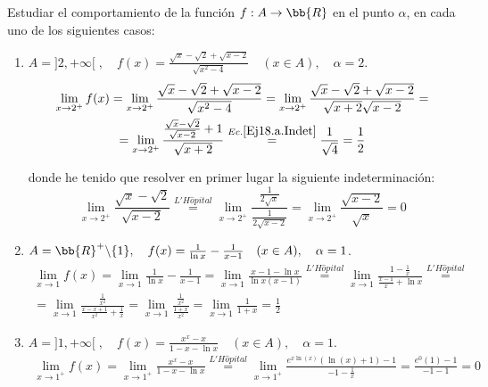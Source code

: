 \begin{ejercicio}
    Estudiar el comportamiento de la función $f:A\to \bb{R}$ en el punto $\alpha$, en cada uno de los siguientes casos:
    \begin{enumerate}
        \item $A = ]2, +\infty[\;,\quad f(x)=\frac{\sqrt{x}-\sqrt{2}+\sqrt{x-2}}{\sqrt{x^2-4}}\quad (x\in A),\quad \alpha = 2$.
        \begin{multline*}
            \lim_{x\to2^+}f(x) = \lim_{x\to2^+}\frac{\sqrt{x}-\sqrt{2}+\sqrt{x-2}}{\sqrt{x^2-4}} = \lim_{x\to2^+}\frac{\sqrt{x}-\sqrt{2}+\sqrt{x-2}}{\sqrt{x+2}\sqrt{x-2}} = \\ = \lim_{x\to2^+}\frac{\frac{\sqrt{x}-\sqrt{2}}{\sqrt{x-2}}+1}{\sqrt{x+2}} \stackrel{Ec.  \ref{Ej18.a.Indet}}{=} \frac{1}{\sqrt{4}} = \frac{1}{2}
        \end{multline*}
        
        donde he tenido que resolver en primer lugar la siguiente indeterminación: \begin{equation}\label{Ej18.a.Indet}
            \lim_{x\to2^+} \frac{\sqrt{x}-\sqrt{2}}{\sqrt{x-2}} \stackrel{L'H\hat{o}pital}{=} \lim_{x\to2^+} \frac{\frac{1}{2\sqrt{x}}}{\frac{1}{2\sqrt{x-2}}} = \lim_{x\to2^+} \frac{\sqrt{x-2}}{\sqrt{x}} = 0
        \end{equation}

        \item $A = \bb{R}^+\backslash\{1\},\quad f(x)=\frac{1}{\ln{x}}-\frac{1}{x-1}\quad (x\in A),\quad \alpha = 1$.
        \begin{multline*}
            \lim_{x\to1}f(x)=\lim_{x\to1}\frac{1}{\ln{x}}-\frac{1}{x-1} = \lim_{x\to1} \frac{x-1-\ln{x}}{\ln{x}(x-1)}
            \stackrel{L'H\hat{o}pital}{=}
            \lim_{x\to1}\frac{1-\frac{1}{x}}{\frac{x-1}{x} + \ln{x}} \stackrel{L'H\hat{o}pital}{=}\\
            = \lim_{x\to1}\frac{\frac{1}{x^2}}{\frac{x-x+1}{x^2}+\frac{1}{x}}
            = \lim_{x\to1}\frac{\frac{1}{x^2}}{\frac{1+x}{x^2}}
            = \lim_{x\to1}\frac{1}{1+x} = \frac{1}{2}
        \end{multline*}

        \item $A = ]1, +\infty[\;,\quad f(x)=\frac{x^x-x}{1-x-\ln{x}}\quad (x\in A),\quad \alpha = 1$.
        \begin{multline*}
            \lim_{x\to1^+}f(x)
            =\lim_{x\to1^+}\frac{x^x-x}{1-x-\ln{x}}
            \stackrel{L'H\hat{o}pital}{=} \lim_{x\to1^+}\frac{e^{x\ln(x)}(\ln(x) + 1) - 1}{-1-\frac{1}{x}} = \frac{e^0(1) - 1}{-1-1} = 0
        \end{multline*}


\end{enumerate}
\end{ejercicio}
